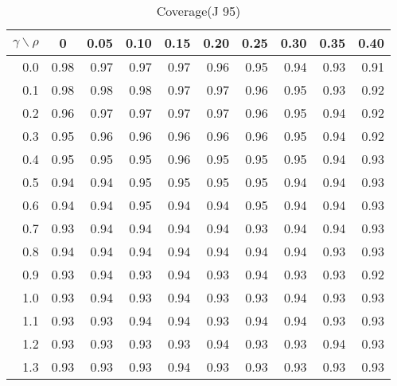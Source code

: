 \documentclass[12pt]{article}
\begin{document}
%
\begin{table}[!tbp]
\caption{Coverage(J 95)}
 \begin{center}
 \begin{tabular}{r|rrrrrrrrr}\hline\hline
\multicolumn{1}{c|}{$\gamma\backslash\rho$}&\multicolumn{1}{c}{0}&\multicolumn{1}{c}{0.05}&\multicolumn{1}{c}{0.10}&\multicolumn{1}{c}{0.15}&\multicolumn{1}{c}{0.20}&\multicolumn{1}{c}{0.25}&\multicolumn{1}{c}{0.30}&\multicolumn{1}{c}{0.35}&\multicolumn{1}{c}{0.40}\tabularnewline
\hline
0.0&0.98&0.97&0.97&0.97&0.96&0.95&0.94&0.93&0.91\tabularnewline
0.1&0.98&0.98&0.98&0.97&0.97&0.96&0.95&0.93&0.92\tabularnewline
0.2&0.96&0.97&0.97&0.97&0.97&0.96&0.95&0.94&0.92\tabularnewline
0.3&0.95&0.96&0.96&0.96&0.96&0.96&0.95&0.94&0.92\tabularnewline
0.4&0.95&0.95&0.95&0.96&0.95&0.95&0.95&0.94&0.93\tabularnewline
0.5&0.94&0.94&0.95&0.95&0.95&0.95&0.94&0.94&0.93\tabularnewline
0.6&0.94&0.94&0.95&0.94&0.94&0.95&0.94&0.94&0.93\tabularnewline
0.7&0.93&0.94&0.94&0.94&0.94&0.93&0.94&0.94&0.93\tabularnewline
0.8&0.94&0.94&0.94&0.94&0.94&0.94&0.94&0.93&0.93\tabularnewline
0.9&0.93&0.94&0.93&0.94&0.93&0.94&0.93&0.93&0.92\tabularnewline
1.0&0.93&0.94&0.93&0.94&0.93&0.93&0.94&0.93&0.93\tabularnewline
1.1&0.93&0.93&0.94&0.94&0.93&0.94&0.94&0.93&0.93\tabularnewline
1.2&0.93&0.93&0.93&0.93&0.94&0.93&0.93&0.94&0.93\tabularnewline
1.3&0.93&0.93&0.93&0.94&0.93&0.93&0.93&0.93&0.93\tabularnewline
\hline
\end{tabular}

\end{center}

\end{table}
\end{document}
